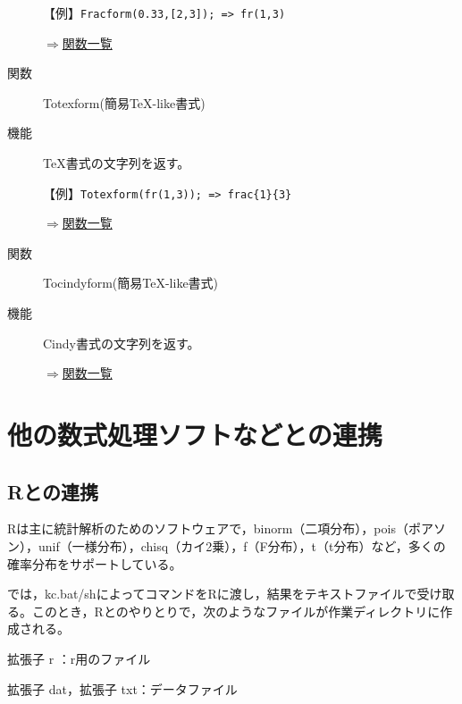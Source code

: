 \documentclass[papersize,a4paper,12pt,uplatex]{jsarticle}
\begin{document}
\begin{description}
\vspace{\baselineskip}
【例】\verb|Fracform(0.33,[2,3]); => fr(1,3)|

\begin{flushright}\hyperlink{functionlist}{$\Rightarrow$関数一覧}\end{flushright}

\vspace{\baselineskip}
\hypertarget{totexform}{}
\item[関数]Totexform(簡易TeX-like書式)
\item[機能]TeX書式の文字列を返す。

\vspace{\baselineskip}
【例】\verb|Totexform(fr(1,3)); => frac{1}{3}|

\begin{flushright}\hyperlink{functionlist}{$\Rightarrow$関数一覧}\end{flushright}

\vspace{\baselineskip}
\hypertarget{tocindyform}{}
\item[関数]Tocindyform(簡易TeX-like書式)
\item[機能]Cindy書式の文字列を返す。

\begin{flushright}\hyperlink{functionlist}{$\Rightarrow$関数一覧}\end{flushright}

\end{description}
\newpage

\section{他の数式処理ソフトなどとの連携}
\subsection{Rとの連携}

Rは主に統計解析のためのソフトウェアで，binorm（二項分布），pois（ポアソン），unif（一様分布），chisq（カイ2乗），f（F分布），t（t分布）など，多くの確率分布をサポートしている。

\ketcindy では，kc.bat/shによってコマンドをRに渡し，結果をテキストファイルで受け取る。このとき，Rとのやりとりで，次のようなファイルが作業ディレクトリに作成される。

拡張子 r ：r用のファイル

拡張子 dat，拡張子 txt：データファイル
\end{document}
